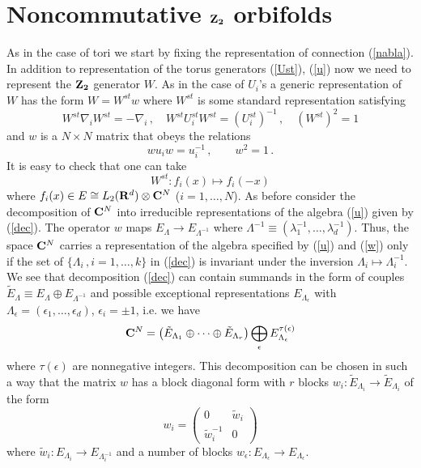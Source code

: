 \documentclass[a4paper,a4paper]{article}
\begin{document}
{%
\section{Noncommutative $\bf Z_{2}$ orbifolds}
As in the case of tori we start by fixing the representation of connection (\ref{nabla}). In addition to representation 
of the torus generators (\ref{Ust}), (\ref{u}) now we need to represent the $\bf Z_{2}$ generator $W$. 
As in the case of $U_{i}$'s a generic representation of $W$ has the form $W=W^{st}w$ where $W^{st}$ is some standard representation 
satisfying 
$$
W^{st}\nabla_{i}W^{st} = - \nabla_{i} \, , \quad W^{st}U_{i}^{st}W^{st} = (U_{i}^{st})^{-1} \, , \quad (W^{st})^{2} = 1 
$$
and $w$ is a $N\times N$ matrix that obeys the relations 
\begin{equation}\label{w}
wu_{i}w=u_{i}^{-1} \, , \qquad w^{2} = 1 \, .
\end{equation}
It is easy to check that one can take 
$$
W^{st} : f_{i}(x) \mapsto f_{i}(-x) 
$$
where $f_{i}(x) \in E\cong L_{2}({\bf R}^{d})\otimes {\bf C}^{N}$ ($i=1, \dots , N$). 
As before consider  the decomposition of  ${\bf C}^{N}$ into irreducible representations of the algebra (\ref{u}) given by (\ref{dec}).  
 The operator $w$ maps $ E_{\Lambda} \to E_{\Lambda^{-1}}$ 
where $\Lambda^{-1} \equiv (\lambda_{1}^{-1}, \dots , \lambda_{d}^{-1})$. Thus, the space ${\bf C}^{N}$ carries a representation 
of the algebra specified by (\ref{u}) and (\ref{w}) only if the set of $\{ \Lambda_{i}\, , i=1, \dots , k\}$ in (\ref{dec}) is 
invariant under the inversion $\Lambda_{i} \mapsto \Lambda_{i}^{-1}$. We see that  decomposition (\ref{dec}) can contain
summands in the form  of couples $\tilde E_{\Lambda}\equiv E_{\Lambda}\oplus E_{\Lambda^{-1}}$  and  possible  exceptional representations 
$E_{\Lambda_{\epsilon}}$ with $\Lambda_{\epsilon} = (\epsilon_{1}, \dots , \epsilon_{d})$, $\epsilon_{i} = \pm 1$, i.e. we have 
\begin{equation} \label{dec2}
{\bf C}^{N} = \left( \tilde E_{\Lambda_{1}} \oplus \dots \oplus \tilde E_{\Lambda_{r}}\right) \bigoplus_{\epsilon} E_{\Lambda_{\epsilon}}^{\tau (\epsilon )}
\end{equation} 
where $\tau (\epsilon )$ are nonnegative integers. 
This decomposition can be chosen in such a way that the  matrix $w$ has a  block diagonal form 
with $r$  blocks $w_{i}: \tilde E_{\Lambda_{i}}\to \tilde E_{\Lambda_{i}}$ of the form  
$$
 w_{i} = \left(
\begin{array}{cc} 0 & \tilde w_{i} \\ 
\tilde w_{i}^{-1} & 0 \end{array} \right) 
$$
where $\tilde w_{i} : E_{\Lambda_{i}} \to  E_{\Lambda_{i}^{-1}}$ and a number of blocks $w_{\epsilon} : E_{\Lambda_{\epsilon}} \to E_{\Lambda_{\epsilon}}$. 


}
\end{document}
